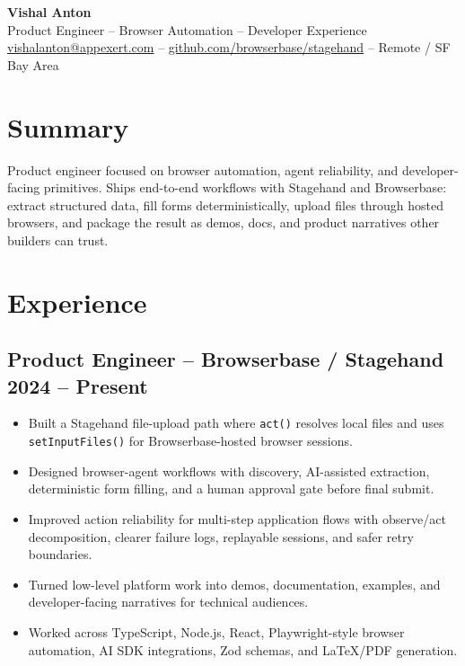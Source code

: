 \documentclass[10pt]{article}
\begin{document}
\begin{center}
{\LARGE\textbf{Vishal Anton}}\\[2pt]
Product Engineer -- Browser Automation -- Developer Experience\\[2pt]
\href{mailto:vishalanton@appexert.com}{vishalanton@appexert.com}
\quad -- \quad
\href{https://github.com/browserbase/stagehand}{github.com/browserbase/stagehand}
\quad -- \quad
Remote / SF Bay Area
\end{center}

\section*{Summary}
Product engineer focused on browser automation, agent reliability, and developer-facing primitives. Ships end-to-end workflows with Stagehand and Browserbase: extract structured data, fill forms deterministically, upload files through hosted browsers, and package the result as demos, docs, and product narratives other builders can trust.

\section*{Experience}

\subsection*{Product Engineer -- Browserbase / Stagehand \hfill 2024 -- Present}
\begin{itemize}
\item Built a Stagehand file-upload path where \texttt{act()} resolves local files and uses \texttt{setInputFiles()} for Browserbase-hosted browser sessions.
\item Designed browser-agent workflows with discovery, AI-assisted extraction, deterministic form filling, and a human approval gate before final submit.
\item Improved action reliability for multi-step application flows with observe/act decomposition, clearer failure logs, replayable sessions, and safer retry boundaries.
\item Turned low-level platform work into demos, documentation, examples, and developer-facing narratives for technical audiences.
\item Worked across TypeScript, Node.js, React, Playwright-style browser automation, AI SDK integrations, Zod schemas, and LaTeX/PDF generation.
\end{itemize}
\end{document}
